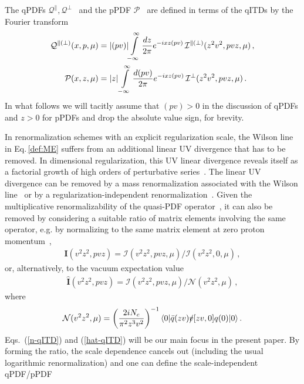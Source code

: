 \documentclass[aps,prd,twocolumn,a4paper,superscriptaddress,10pt,showpacs,notitlepage,floatfix]{revtex4-1}
\begin{document}
The qPDFs $\mathcal{Q}^{\parallel},\mathcal{Q}^{\perp}$~\cite{Ji:2013dva} and the pPDF $\mathcal{P}$~\cite{Radyushkin:2017cyf}
are defined in terms of the qITDs by the Fourier transform
\begin{align}
\label{def:qPDF+pPDF}
\mathcal{Q}^{\parallel(\perp)}(x,p,\mu) &= |(pv)|\! \int\limits_{-\infty}^\infty \frac{d z }{2\pi} e^{-ix z (pv)} \, \mathcal{I}^{\parallel(\perp)}(z^2v^2, pvz,\mu )\,,
\notag\\
\mathcal{P}(x,z,\mu) &= |z| \int\limits_{-\infty}^\infty \frac{d (pv)}{2\pi} e^{-ix z (pv) } \,  \mathcal{I}^{\perp}(z^2v^2,pvz,\mu)\,.     
\end{align}
In what follows we will tacitly assume that $(pv)>0$ in the discussion of qPDFs and $z>0$ for pPDFs and drop the 
absolute value sign, for brevity.

In renormalization schemes with an explicit regularization scale, the Wilson line in Eq.\,\eqref{def:ME} suffers 
from an additional linear UV divergence that has to be removed. In dimensional regularization, this UV linear divergence reveals itself as a factorial growth of high orders of perturbative series~\cite{Beneke:1994sw}. The linear UV divergence can be removed by a mass renormalization associated with the Wilson line~\cite{Dotsenko:1979wb,Craigie:1980qs,Dorn:1986dt} or by a regularization-independent renormalization~\cite{Martinelli:1995vj,Stewart:2017tvs,Chen:2017mzz}. Given the multiplicative renormalizability of the quasi-PDF operator~\cite{Ji:2017oey,Ishikawa:2017faj,Green:2017xeu}, it can also be removed by considering a suitable ratio of matrix elements involving the same operator, e.g. by normalizing to the same matrix element at zero proton momentum~\cite{Orginos:2017kos}, 
\begin{align}
\label{n-qITD}
     \mathbf{I}(v^2z^2, pvz) =  \mathcal{I}(v^2z^2, pvz, \mu) / \mathcal{I}(v^2z^2, 0, \mu)\,, 
\end{align}
or, alternatively, to the vacuum expectation value
\begin{align}
\label{hat-qITD}
     \widehat{\mathbf{I}}(v^2z^2, pvz) =  \mathcal{I}(v^2z^2, pvz, \mu) / \mathcal{N}(v^2z^2,\mu)\,, 
\end{align}
where
\begin{align}
  \mathcal{N}(v^2z^2,\mu) =  \left(\frac{2 i N_c}{\pi^2 z^3 v^2}\right)^{-1} \langle 0| \bar q(zv) \slashed{v} [zv,0] q(0) |0\rangle\,.
\end{align}
Eqs.~(\ref{n-qITD}) and (\ref{hat-qITD}) will be our main focus in the present paper. By forming the ratio, the scale dependence cancels out (including the usual logarithmic renormalization) and one can define the scale-independent qPDF/pPDF
\end{document}
